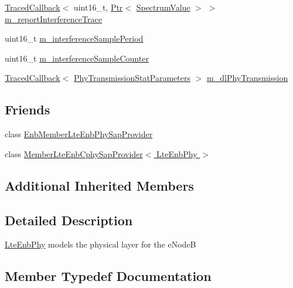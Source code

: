 \begin{DoxyCompactItemize}
\item 
\hyperlink{classns3_1_1TracedCallback}{Traced\+Callback}$<$ uint16\+\_\+t, \hyperlink{classns3_1_1Ptr}{Ptr}$<$ \hyperlink{classns3_1_1SpectrumValue}{Spectrum\+Value} $>$ $>$ \hyperlink{classns3_1_1LteEnbPhy_ab0680f139d0eb336e9d1d3dffcee80a1}{m\+\_\+report\+Interference\+Trace}
\item 
uint16\+\_\+t \hyperlink{classns3_1_1LteEnbPhy_a0df64498bdf6e3e601ea8567c8cc94f3}{m\+\_\+interference\+Sample\+Period}
\item 
uint16\+\_\+t \hyperlink{classns3_1_1LteEnbPhy_ae02d838d9c62766bd75c1cce96bc802b}{m\+\_\+interference\+Sample\+Counter}
\item 
\hyperlink{classns3_1_1TracedCallback}{Traced\+Callback}$<$ \hyperlink{structns3_1_1PhyTransmissionStatParameters}{Phy\+Transmission\+Stat\+Parameters} $>$ \hyperlink{classns3_1_1LteEnbPhy_af17fb1bef18925f674f062e996135955}{m\+\_\+dl\+Phy\+Transmission}
\end{DoxyCompactItemize}
\subsection*{Friends}
\begin{DoxyCompactItemize}
\item 
class \hyperlink{classns3_1_1LteEnbPhy_ab39a4c7aed169d2603e336c7248c6fc3}{Enb\+Member\+Lte\+Enb\+Phy\+Sap\+Provider}
\item 
class \hyperlink{classns3_1_1LteEnbPhy_af5ddf6fa42c29094f7f3b38c31497c45}{Member\+Lte\+Enb\+Cphy\+Sap\+Provider$<$ Lte\+Enb\+Phy $>$}
\end{DoxyCompactItemize}
\subsection*{Additional Inherited Members}


\subsection{Detailed Description}
\hyperlink{classns3_1_1LteEnbPhy}{Lte\+Enb\+Phy} models the physical layer for the e\+NodeB 

\subsection{Member Typedef Documentation}
